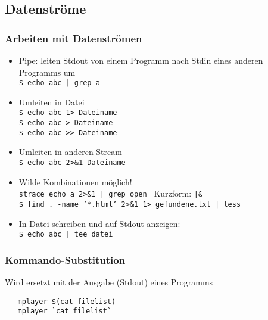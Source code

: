 \documentclass{beamer}
\begin{document}
\subsection{Datenströme}
\begin{frame}
\frametitle{Arbeiten mit Datenströmen}
 \begin{itemize}
  \item Pipe: leiten Stdout von einem Programm nach Stdin eines anderen Programms um\\
   {\tt\small \$ echo abc | grep a}
  \item Umleiten in Datei\\
   {\tt\small \$ echo abc 1> Dateiname}\\
   {\tt\small \$ echo abc > Dateiname}\\
   {\tt\small \$ echo abc >> Dateiname}
  \item Umleiten in anderen Stream\\
   {\tt\small \$ echo abc 2>\&1 Dateiname}
  \item Wilde Kombinationen möglich!\\
   {\tt\small strace echo a 2>\&1 | grep open }  Kurzform: {\tt |\&} \\
   {\tt\small \$ find . -name '*.html' 2>\&1 1> gefundene.txt | less }
  \item In Datei schreiben und auf Stdout anzeigen: \\
   {\tt\small \$ echo abc | tee datei }
 \end{itemize}
\end{frame}

\begin{frame}[fragile]
 \frametitle{Kommando-Substitution}
 Wird ersetzt mit der Ausgabe (Stdout) eines Programms
 \begin{lstlisting}
   mplayer $(cat filelist)
   mplayer `cat filelist`
 \end{lstlisting}
\end{frame}
\end{document}

